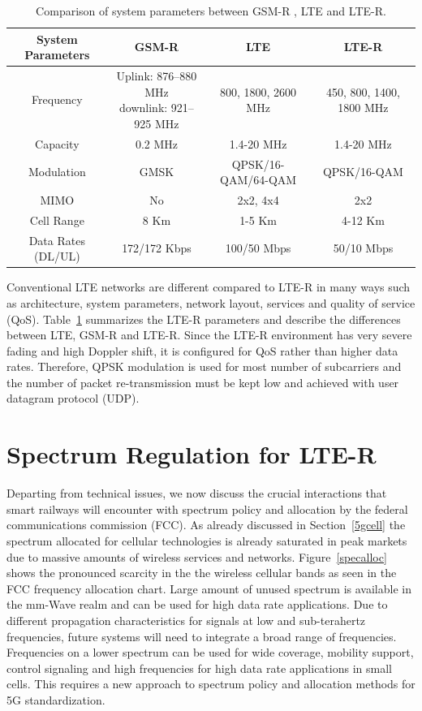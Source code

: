 \begin{table}[h!]
\caption{Comparison of system parameters between GSM-R , LTE and LTE-R.}
\begin{adjustbox}{width=1.22\textwidth, center=\textwidth}
\begin{tabular}{c | c | c | c}
\toprule
System Parameters & GSM-R & LTE & LTE-R\\ 
\midrule
Frequency & \shortstack{Uplink: 876--880 MHz\\downlink: 921--925 MHz} & 800, 1800, 2600 MHz & 450, 800, 1400, 1800 MHz \\  
Capacity  & 0.2 MHz & 1.4-20 MHz & 1.4-20 MHz\\ 
Modulation  & GMSK & QPSK/16-QAM/64-QAM & QPSK/16-QAM\\ 
MIMO  & No  & 2x2, 4x4  & 2x2\\ 
Cell Range  & 8 Km  & 1-5 Km & 4-12 Km \\ 
Data Rates (DL/UL)  & 172/172 Kbps  & 100/50 Mbps & 50/10 Mbps\\ 
\bottomrule
\end{tabular}
\end{adjustbox}
\label{ltertable}
\end{table}

Conventional LTE networks are different compared to LTE-R in many ways such as architecture, system parameters, network layout, services and quality of service (QoS). Table~\ref{ltertable} summarizes the LTE-R parameters and describe the differences between LTE, GSM-R and LTE-R. Since the LTE-R environment has very severe fading and high Doppler shift, it is configured for QoS rather than higher data rates. Therefore, QPSK modulation is used for most number of subcarriers and the number of packet re-transmission must be kept low and achieved with user datagram protocol (UDP).


\section{Spectrum Regulation for LTE-R}

Departing from technical issues, we now discuss the crucial interactions that smart railways will encounter with spectrum policy and allocation by the federal communications commission (FCC). As already discussed in Section~\ref{5gcell} the spectrum allocated for cellular technologies is already saturated in peak markets due to massive amounts of wireless services and networks. Figure~\ref{specalloc} shows the pronounced scarcity in the the wireless cellular bands as seen in the FCC frequency allocation chart. Large amount of unused spectrum is available in the mm-Wave realm and can be used for high data rate applications. Due to different propagation characteristics for signals at low and sub-terahertz frequencies, future systems will need to integrate a broad range of frequencies. Frequencies on a lower spectrum can be used for wide coverage, mobility support, control signaling and high frequencies for high data rate applications in small cells. This requires a new approach to spectrum policy and allocation methods for 5G standardization.

